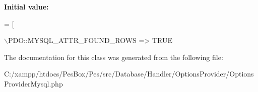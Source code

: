 {\bfseries Initial value\+:}
\begin{DoxyCode}
= [
        
        
        
        \(\backslash\)PDO::MYSQL\_ATTR\_FOUND\_ROWS => TRUE
\end{DoxyCode}


The documentation for this class was generated from the following file\+:\begin{DoxyCompactItemize}
\item 
C\+:/xampp/htdocs/\+Pes\+Box/\+Pes/src/\+Database/\+Handler/\+Options\+Provider/Options\+Provider\+Mysql.\+php\end{DoxyCompactItemize}
